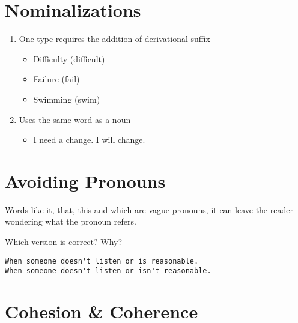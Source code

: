 \documentclass[10pt,a4paper]{book}
\begin{document}
\section{Nominalizations}
\begin{enumerate}
\item One type requires the addition of derivational suffix
\begin{itemize}
\item Difficulty (difficult)
\item  Failure (fail)
\item Swimming (swim)
\end{itemize}
\item Uses the same word as a noun
\begin{itemize}
\item I need a change. I will change.
\end{itemize}
\end{enumerate}


\section{Avoiding Pronouns}\label{Avoiding Pronouns}

Words like it, that, this and which are vague pronouns, it can leave the reader wondering what the pronoun refers.





Which version is correct? Why?
\begin{verbatim}
When someone doesn't listen or is reasonable.
When someone doesn't listen or isn't reasonable.
\end{verbatim}


\section{Cohesion \& Coherence}
\end{document}
